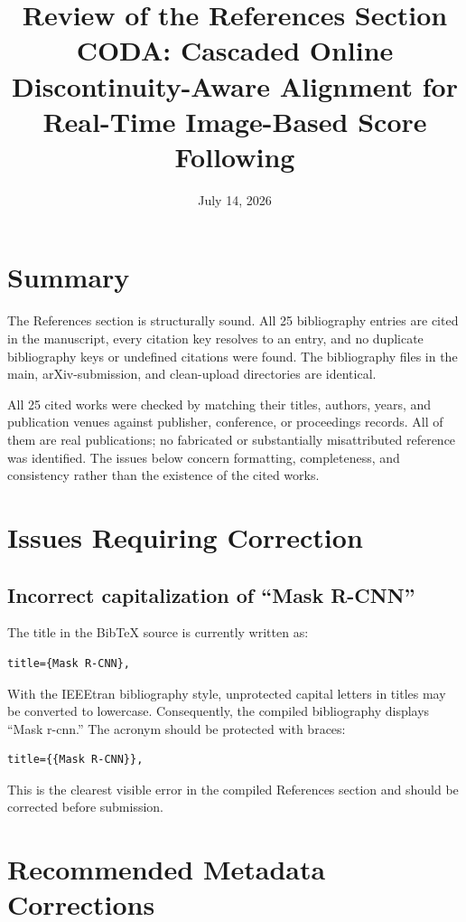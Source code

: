 \documentclass[11pt]{article}
\title{Review of the References Section\\\large CODA: Cascaded Online Discontinuity-Aware Alignment for Real-Time Image-Based Score Following}
\author{}
\date{July 14, 2026}
\begin{document}
\maketitle

\section{Summary}

The References section is structurally sound. All 25 bibliography entries are cited in the manuscript, every citation key resolves to an entry, and no duplicate bibliography keys or undefined citations were found. The bibliography files in the main, arXiv-submission, and clean-upload directories are identical.

All 25 cited works were checked by matching their titles, authors, years, and publication venues against publisher, conference, or proceedings records. All of them are real publications; no fabricated or substantially misattributed reference was identified. The issues below concern formatting, completeness, and consistency rather than the existence of the cited works.

\section{Issues Requiring Correction}

\subsection{Incorrect capitalization of ``Mask R-CNN''}

The title in the BibTeX source is currently written as:

\begin{verbatim}
title={Mask R-CNN},
\end{verbatim}

With the IEEEtran bibliography style, unprotected capital letters in titles may be converted to lowercase. Consequently, the compiled bibliography displays ``Mask r-cnn.'' The acronym should be protected with braces:

\begin{verbatim}
title={{Mask R-CNN}},
\end{verbatim}

This is the clearest visible error in the compiled References section and should be corrected before submission.

\section{Recommended Metadata Corrections}
\end{document}
